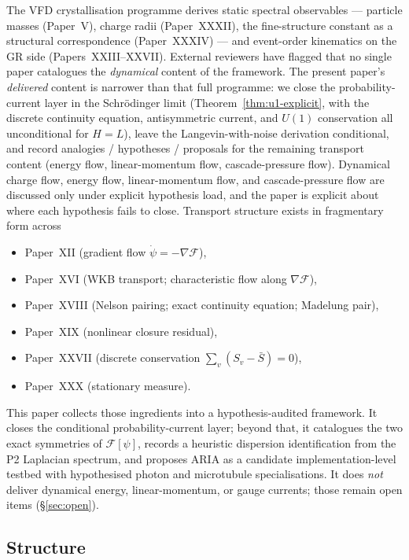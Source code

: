 \documentclass[11pt]{article}
\theoremstyle{definition}
\newcommand{\Fcal}{\mathcal{F}}
\begin{document}
The VFD crystallisation programme derives static spectral observables --- particle masses (Paper~V), charge radii (Paper~XXXII), the fine-structure constant as a structural correspondence (Paper~XXXIV) --- and event-order kinematics on the GR side (Papers~XXIII--XXVII). External reviewers have flagged that no single paper catalogues the \emph{dynamical} content of the framework. The present paper's \emph{delivered} content is narrower than that full programme: we close the probability-current layer in the Schr\"{o}dinger limit (Theorem~\ref{thm:u1-explicit}, with the discrete continuity equation, antisymmetric current, and $U(1)$ conservation all unconditional for $H = L$), leave the Langevin-with-noise derivation conditional, and record analogies / hypotheses / proposals for the remaining transport content (energy flow, linear-momentum flow, cascade-pressure flow). Dynamical charge flow, energy flow, linear-momentum flow, and cascade-pressure flow are discussed only under explicit hypothesis load, and the paper is explicit about where each hypothesis fails to close. Transport structure exists in fragmentary form across
\begin{itemize}
    \item Paper~XII (gradient flow $\dot\psi = -\nabla\Fcal$),
    \item Paper~XVI (WKB transport; characteristic flow along $\nabla\Fcal$),
    \item Paper~XVIII (Nelson pairing; exact continuity equation; Madelung pair),
    \item Paper~XIX (nonlinear closure residual),
    \item Paper~XXVII (discrete conservation $\sum_v (S_v - \bar S) = 0$),
    \item Paper~XXX (stationary measure).
\end{itemize}
This paper collects those ingredients into a hypothesis-audited framework. It closes the conditional probability-current layer; beyond that, it catalogues the two exact symmetries of $\Fcal[\psi]$, records a heuristic dispersion identification from the P2 Laplacian spectrum, and proposes ARIA as a candidate implementation-level testbed with hypothesised photon and microtubule specialisations. It does \emph{not} deliver dynamical energy, linear-momentum, or gauge currents; those remain open items (\S\ref{sec:open}).

\subsection{Structure}
\end{document}
